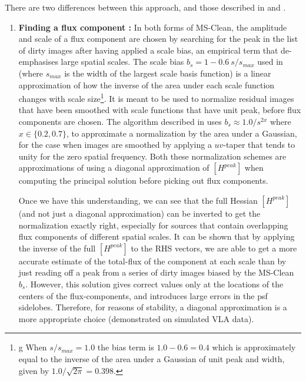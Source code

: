 \documentclass[structabstract]{stylefiles/aa}
\begin{document}
There are two differences between this approach, and those described in \citet{MSCLEAN} and \citet{ERIC_MSCLEAN}.
\begin{enumerate}
\item {\bf Finding a flux component : }
In both forms of MS-Clean, 
the amplitude and scale of a
flux component are chosen by searching for the peak in the list of dirty
images after having applied a scale bias, 
an empirical term that de-emphasises large spatial scales.
The scale bias $b_s = 1-0.6~s/s_{max}$  used in \citet{MSCLEAN}
(where $s_{max}$ is the width of the largest scale basis function)
is a linear approximation of how the inverse of the area under each
scale function changes with scale size\footnote
{g
When $s/s_{max} = 1.0$ the bias term is $1.0 - 0.6 = 0.4$ which is approximately equal
 to the inverse of the area under a Gaussian of unit peak and 
 width, given by ${1.0}/{\sqrt{2\pi}} = 0.398$.}.
It is meant to be used to normalize residual images that have been smoothed with 
scale functions that have unit peak, before flux components are chosen.
The algorithm described in \citet{ERIC_MSCLEAN} uses 
$b_s \approx 1.0/s^{2x}$ where $x\in\{0.2,0.7\}$, to approximate
a normalization by the area under a Gaussian,
for the case when images are smoothed by applying a $uv$-taper 
that tends to unity for the zero spatial frequency.
%
Both these normalization schemes are 
approximations of using a diagonal approximation of $[H^{peak}]$ 
when computing the principal solution before picking out flux components. 

Once we have this understanding, we can see that the full Hessian $[H^{peak}]$ 
(and not just a diagonal approximation)
can be inverted to get the normalization exactly right, especially for sources
that contain overlapping flux components of different spatial scales. 
It can be shown 
that by applying the inverse of the full $[H^{peak}]$ to the RHS vectors,
 we are able to 
get a more accurate estimate of the total-flux of the component at each scale 
than by just reading off a peak from a series of dirty images biased by the MS-Clean $b_s$. 
However, this solution gives correct values only at the locations of the
centers of the flux-components, and introduces large errors in the psf sidelobes.
Therefore, for reasons of stability, a diagonal approximation is a more 
appropriate choice (demonstrated on simulated VLA data). 


\end{enumerate}
\end{document}
